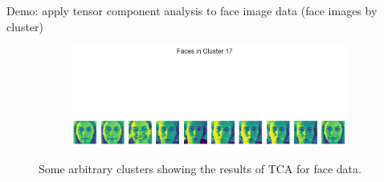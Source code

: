 \documentclass[xcolor={dvipsnames,svgnames}]{beamer}
\begin{document}
\begin{frame}{Demo: apply tensor component analysis to face image data (face images by cluster)}
\begin{figure}[H]
\begin{subfigure}[b]{0.45\textwidth}
            \end{subfigure}
            \hfill
            \begin{subfigure}[b]{0.45\textwidth}
                \includegraphics[width=\textwidth]{figures-face-results/face17.png}
            \end{subfigure}
            \caption{Some arbitrary clusters showing the results of TCA for face data.}
            \end{figure} 
\end{frame}
\end{document}
